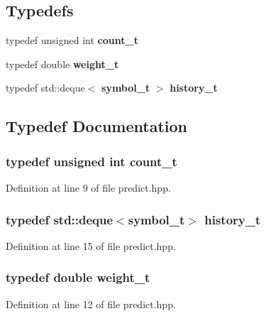 \subsection*{Typedefs}
\begin{DoxyCompactItemize}
\item 
typedef unsigned int {\bf count\+\_\+t}
\item 
typedef double {\bf weight\+\_\+t}
\item 
typedef std\+::deque$<$ {\bf symbol\+\_\+t} $>$ {\bf history\+\_\+t}
\end{DoxyCompactItemize}


\subsection{Typedef Documentation}
\subsubsection[{count\+\_\+t}]{\setlength{\rightskip}{0pt plus 5cm}typedef unsigned int {\bf count\+\_\+t}}\label{predict_8hpp_a16e0562e486ffc952cb8f7ca8eefe205}


Definition at line 9 of file predict.\+hpp.

\subsubsection[{history\+\_\+t}]{\setlength{\rightskip}{0pt plus 5cm}typedef std\+::deque$<${\bf symbol\+\_\+t}$>$ {\bf history\+\_\+t}}\label{predict_8hpp_a5b32b228df5bc910d9bfe7a0310828e5}


Definition at line 15 of file predict.\+hpp.

\subsubsection[{weight\+\_\+t}]{\setlength{\rightskip}{0pt plus 5cm}typedef double {\bf weight\+\_\+t}}\label{predict_8hpp_ac7889bf9b3596f63c57011af217212dd}


Definition at line 12 of file predict.\+hpp.

